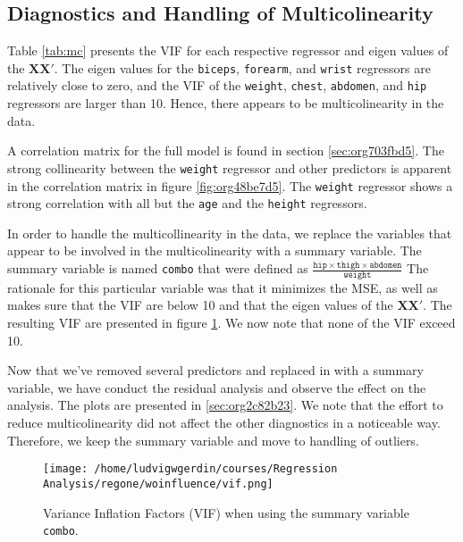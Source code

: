 \documentclass[11pt]{article}
\begin{document}
\subsection{Diagnostics and Handling of Multicolinearity}
\label{sec:orga21edd2}

Table \ref{tab:mc} presents the VIF for each respective regressor and eigen values of the
\(\textbf{X}\textbf{X}'\). The eigen values for the 
\texttt{biceps}, \texttt{forearm}, and \texttt{wrist} regressors are relatively close to zero, and the
VIF of the \texttt{weight}, \texttt{chest}, \texttt{abdomen}, and \texttt{hip} regressors are larger than 10.
Hence, there appears to be multicolinearity in the data.

A correlation matrix for the full model is found in section \ref{sec:org703fbd5}. The strong collinearity
between the \texttt{weight} regressor and other predictors is apparent in the correlation matrix in figure
\ref{fig:org48be7d5}. The \texttt{weight} regressor shows a strong correlation with all but the \texttt{age} and
the \texttt{height} regressors.

 

In order to handle the multicollinearity in the data, we replace the variables that appear to be involved 
in the multicolinearity with a summary variable. \cite{Montgomery2012} The summary variable is named
\texttt{combo} that were defined as \(\frac{\texttt{hip}\times\texttt{thigh}\times\texttt{abdomen}}{\texttt{weight}}\)
The rationale for this particular variable was that it minimizes the MSE, as well as makes sure that the VIF
are below 10 and that the eigen values of the \(\textbf{X}\textbf{X}'\). The resulting VIF are presented in figure \ref{fig:org04a3053}. We now note that none of the VIF exceed 10.

Now that we've removed several predictors and replaced in with a summary variable, we have conduct the 
residual analysis and observe the effect on the analysis. The plots are presented in \ref{sec:org2c82b23}. We note that 
the effort to reduce multicolinearity did not affect the other diagnostics in a noticeable way. Therefore,
we keep the summary variable and move to handling of outliers.

\begin{figure}[htbp]
\centering
\texttt{[image: /home/ludvigwgerdin/courses/Regression Analysis/regone/woinfluence/vif.png]}
\caption{\label{fig:org04a3053}
Variance Inflation Factors (VIF) when using the summary variable \texttt{combo}.}
\end{figure}   
\end{document}
